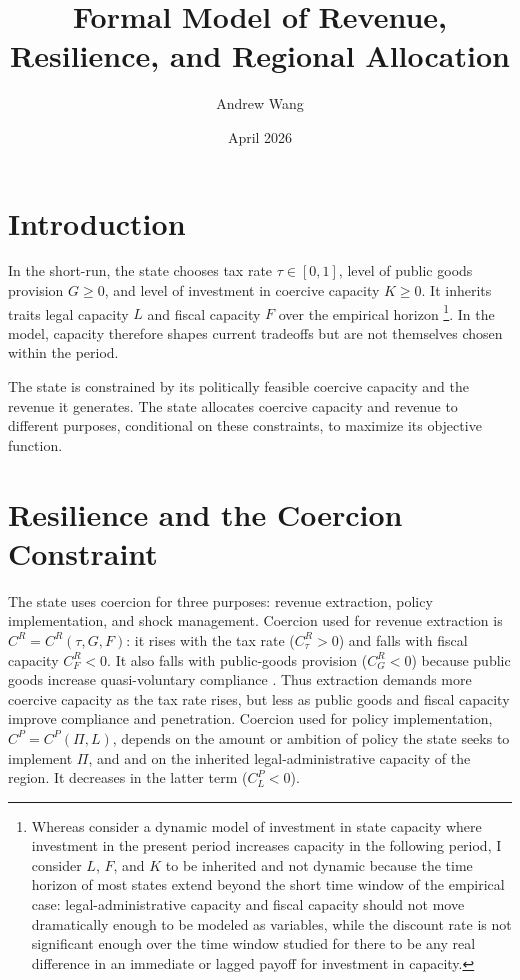 \documentclass[12pt]{article}
\title{Formal Model of Revenue, Resilience, and Regional Allocation}
\author{Andrew Wang}
\date{April 2026}
\begin{document}
\maketitle

\section*{Introduction}

In the short-run, the state chooses tax rate $\tau \in [0,1]$, level of public goods provision $G \ge 0$, and level of investment in coercive capacity $K \ge 0$. It inherits traits legal capacity $L$ and fiscal capacity $F$ over the empirical horizon \footnote{Whereas \cite{besleyOriginsStateCapacity2009} consider a dynamic model of investment in state capacity where investment in the present period increases capacity in the following period, I consider $L$, $F$, and $K$ to be inherited and not dynamic because the time horizon of most states extend beyond the short time window of the empirical case: legal-administrative capacity and fiscal capacity should not move dramatically enough to be modeled as variables, while the discount rate is not significant enough over the time window studied for there to be any real difference in an immediate or lagged payoff for investment in capacity.}. In the model, capacity therefore shapes current tradeoffs but are not themselves chosen within the period.

The state is constrained by its politically feasible coercive capacity and the revenue it generates. The state allocates coercive capacity and revenue to different purposes, conditional on these constraints, to maximize its objective function.

\section* {Resilience and the Coercion Constraint}

The state uses coercion for three purposes: revenue extraction, policy implementation, and shock management. Coercion used for revenue extraction is $C^R = C^R(\tau,G,F)$: it rises with the tax rate ($C^R_{\tau} > 0$) and falls with fiscal capacity $C^R_F < 0$. It also falls with public-goods provision ($C^R_G < 0$) because public goods increase quasi-voluntary compliance \cite{levi1988}. Thus extraction demands more coercive capacity as the tax rate rises, but less as public goods and fiscal capacity improve compliance and penetration. Coercion used for policy implementation, $C^P = C^P(\Pi,L)$, depends on the amount or ambition of policy the state seeks to implement $\Pi$, and and on the inherited legal-administrative capacity of the region. It decreases in the latter term ($C^P_L < 0$).
\end{document}
